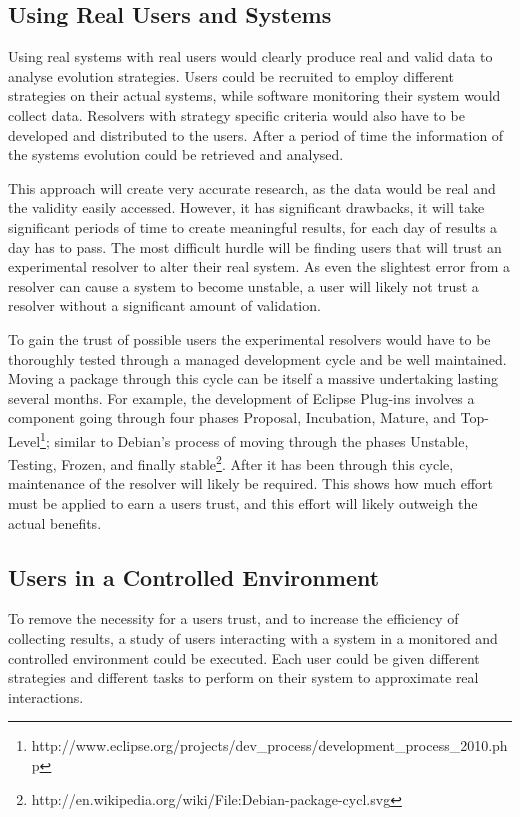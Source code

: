 \subsection{Using Real Users and Systems}
Using real systems with real users would clearly produce real and valid data to analyse evolution strategies.
Users could be recruited to employ different strategies on their actual systems, while software monitoring their system would collect data.
Resolvers with strategy specific criteria would also have to be developed and distributed to the users.
After a period of time the information of the systems evolution could be retrieved and analysed.

This approach will create very accurate research, as the data would be real and the validity easily accessed. 
However, it has significant drawbacks,
it will take significant periods of time to create meaningful results, for each day of results a day has to pass.
The most difficult hurdle will be finding users that will trust an experimental resolver to alter their real system.   
As even the slightest error from a resolver can cause a system to become unstable, a user will likely not trust a resolver without a significant amount of validation.

To gain the trust of possible users the experimental resolvers would have to be thoroughly tested through a managed development cycle and be well maintained.
Moving a package through this cycle can be itself a massive undertaking lasting several months. 
For example, the development of Eclipse Plug-ins involves a component going through four phases 
Proposal, Incubation, Mature, and Top-Level\footnote{http://www.eclipse.org/projects/dev\_process/development\_process\_2010.php};
similar to Debian's process of moving through the phases Unstable, Testing, Frozen, and finally stable\footnote{http://en.wikipedia.org/wiki/File:Debian-package-cycl.svg}.
After it has been through this cycle, maintenance of the resolver will likely be required.
This shows how much effort must be applied to earn a users trust, and this effort will likely outweigh the actual benefits.

\subsection{Users in a Controlled Environment}
To remove the necessity for a users trust, and to increase the efficiency of collecting results, 
a study of users interacting with a system in a monitored and controlled environment could be executed.
Each user could be given different strategies and different tasks to perform on their system to approximate real interactions.

